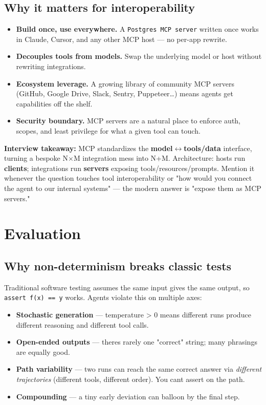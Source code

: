 \documentclass[11pt]{article}
\providecommand{\tightlist}{\setlength{\itemsep}{1pt}\setlength{\parskip}{0pt}}
\begin{document}
\subsection{Why it matters for interoperability}\label{why-it-matters-for-interoperability}

\begin{itemize}
\tightlist
\item
  \textbf{Build once, use everywhere.} A \texttt{Postgres\ MCP\ server} written once works in Claude, Cursor, and any other MCP host --- no per-app rewrite.
\item
  \textbf{Decouples tools from models.} Swap the underlying model or host without rewriting integrations.
\item
  \textbf{Ecosystem leverage.} A growing library of community MCP servers (GitHub, Google Drive, Slack, Sentry, Puppeteer\ldots) means agents get capabilities off the shelf.
\item
  \textbf{Security boundary.} MCP servers are a natural place to enforce auth, scopes, and least privilege for what a given tool can touch.
\end{itemize}

\textbf{Interview takeaway:} MCP standardizes the \textbf{model\(\leftrightarrow\)tools/data} interface, turning a bespoke N\(\times\)M integration mess into N+M. Architecture: hosts run \textbf{clients}; integrations run \textbf{servers} exposing tools/resources/prompts. Mention it whenever the question touches tool interoperability or "how would you connect the agent to our internal systems" --- the modern answer is "expose them as MCP servers."

\section{Evaluation}\label{evaluation}

\subsection{Why non-determinism breaks classic tests}\label{why-non-determinism-breaks-classic-tests}

Traditional software testing assumes the same input gives the same output, so \texttt{assert\ f(x)\ ==\ y} works. Agents violate this on multiple axes:

\begin{itemize}
\tightlist
\item
  \textbf{Stochastic generation} --- temperature \textgreater{} 0 means different runs produce different reasoning and different tool calls.
\item
  \textbf{Open-ended outputs} --- there\textquotesingle s rarely one "correct" string; many phrasings are equally good.
\item
  \textbf{Path variability} --- two runs can reach the same correct answer via \emph{different trajectories} (different tools, different order). You can\textquotesingle t assert on the path.
\item
  \textbf{Compounding} --- a tiny early deviation can balloon by the final step.
\end{itemize}
\end{document}
